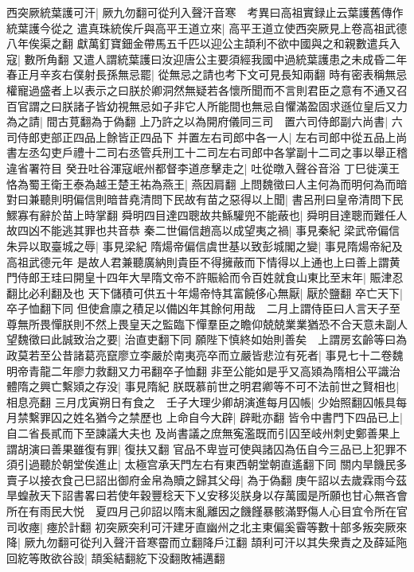 西突厥統葉護可汗|{
	厥九勿翻可從刋入聲汗音寒　考異曰高祖實録止云葉護舊傳作統葉護今從之}
遣真珠統俟斤與高平王道立來|{
	高平王道立使西突厥見上卷高祖武德八年俟渠之翻}
獻萬釘寶鈿金帶馬五千匹以迎公主頡利不欲中國與之和親數遣兵入寇|{
	數所角翻}
又遣人謂統葉護曰汝迎唐公主要須經我國中過統葉護患之未成昏二年春正月辛亥右僕射長孫無忌罷|{
	從無忌之請也考下文可見長知兩翻}
時有密表稱無忌權寵過盛者上以表示之曰朕於卿洞然無疑若各懷所聞而不言則君臣之意有不通又召百官謂之曰朕諸子皆幼視無忌如子非它人所能間也無忌自懼滿盈固求遜位皇后又力為之請|{
	間古莧翻為于偽翻}
上乃許之以為開府儀同三司　置六司侍郎副六尚書|{
	六司侍郎吏部正四品上餘皆正四品下}
并置左右司郎中各一人|{
	左右司郎中從五品上尚書左丞勾吏戶禮十二司右丞管兵刑工十二司左右司郎中各掌副十二司之事以舉正稽違省署符目}
癸丑吐谷渾寇岷州都督李道彦擊走之|{
	吐從暾入聲谷音浴}
丁巳徙漢王恪為蜀王衛王泰為越王楚王祐為燕王|{
	燕因肩翻}
上問魏徵曰人主何為而明何為而暗對曰兼聽則明偏信則暗昔堯清問下民故有苗之惡得以上聞|{
	書呂刑曰皇帝清問下民鰥寡有辭於苗上時掌翻}
舜明四目達四聰故共鯀驩兜不能蔽也|{
	舜明目達聰而難任人故四凶不能逃其罪也共音恭}
秦二世偏信趙高以成望夷之禍|{
	事見秦紀}
梁武帝偏信朱异以取臺城之辱|{
	事見梁紀}
隋煬帝偏信虞世基以致彭城閣之變|{
	事見隋煬帝紀及高祖武德元年}
是故人君兼聽廣納則貴臣不得擁蔽而下情得以上通也上曰善上謂黄門侍郎王珪曰開皇十四年大旱隋文帝不許賑給而令百姓就食山東比至末年|{
	賑津忍翻比必利翻及也}
天下儲積可供五十年煬帝恃其富饒侈心無厭|{
	厭於鹽翻}
卒亡天下|{
	卒子恤翻下同}
但使倉廪之積足以備凶年其餘何用哉　二月上謂侍臣曰人言天子至尊無所畏憚朕則不然上畏皇天之監臨下憚羣臣之瞻仰兢兢業業猶恐不合天意未副人望魏徵曰此誠致治之要|{
	治直吏翻下同}
願陛下慎終如始則善矣　上謂房玄齡等曰為政莫若至公昔諸葛亮竄廖立李嚴於南夷亮卒而立嚴皆悲泣有死者|{
	事見七十二卷魏明帝青龍二年廖力救翻又力弔翻卒子恤翻}
非至公能如是乎又高熲為隋相公平識治體隋之興亡繫熲之存没|{
	事見隋紀}
朕既慕前世之明君卿等不可不法前世之賢相也|{
	相息亮翻}
三月戊寅朔日有食之　壬子大理少卿胡演進每月囚帳|{
	少始照翻囚帳具每月禁繫罪囚之姓名猶今之禁歷也}
上命自今大辟|{
	辟毗亦翻}
皆令中書門下四品已上|{
	自二省長貳而下至諫議大夫也}
及尚書議之庶無寃濫既而引囚至岐州刺史鄭善果上謂胡演曰善果雖復有罪|{
	復扶又翻}
官品不卑豈可使與諸囚為伍自今三品已上犯罪不須引過聽於朝堂俟進止|{
	太極宫承天門左右有東西朝堂朝直遙翻下同}
關内旱饑民多賣子以接衣食己巳詔出御府金帛為贖之歸其父母|{
	為于偽翻}
庚午詔以去歲霖雨今茲旱蝗赦天下詔書畧曰若使年穀豐稔天下乂安移災朕身以存萬國是所願也甘心無吝會所在有雨民大悦　夏四月己卯詔以隋末亂離因之饑饉暴骸滿野傷人心目宜令所在官司收瘞|{
	瘞於計翻}
初突厥突利可汗建牙直幽州之北主東偏奚霫等數十部多叛突厥來降|{
	厥九勿翻可從刋入聲汗音寒霤而立翻降戶江翻}
頡利可汗以其失衆責之及薛延陁回紇等敗欲谷設|{
	頡奚結翻紇下没翻敗補邁翻}
